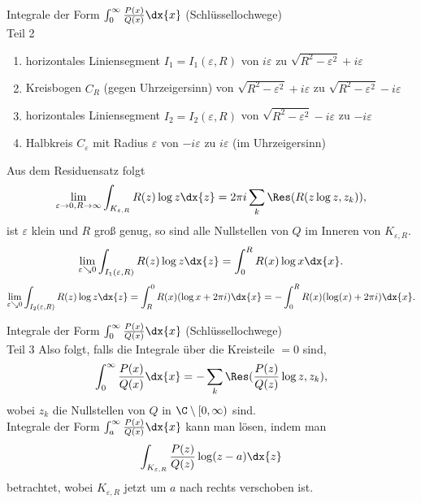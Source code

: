 \begin{karte}{Integrale der Form \( \int_0^\infty \frac{P(x)}{Q(x)} \dx{x} \) (Schlüssellochwege) \\Teil 2}
    \begin{enumerate}
        \item horizontales Liniensegment \(I_1 = I_1(\varepsilon, R)\) von \(i\varepsilon\) 
        zu \(\sqrt{R^2-\varepsilon^2} + i\varepsilon\)
        \item Kreisbogen \(C_R\) (gegen Uhrzeigersinn) von \(\sqrt{R^2-\varepsilon^2} + i\varepsilon\) 
        zu \(\sqrt{R^2-\varepsilon^2} - i\varepsilon\)
        \item horizontales Liniensegment \(I_2 = I_2(\varepsilon, R)\) von 
        \(\sqrt{R^2-\varepsilon^2} - i\varepsilon\) zu \(-i\varepsilon\)
        \item Halbkreis \(C_\varepsilon\) mit Radius \(\varepsilon\) von 
        \(-i\varepsilon\) zu \(i\varepsilon\) (im Uhrzeigersinn)
    \end{enumerate}
    Aus dem Residuensatz folgt 
    \[ \lim_{\varepsilon\rightarrow 0, R \rightarrow \infty} 
    \int_{K_{\varepsilon, R}} R(z) \log z \dx{z} 
    = 2\pi i \sum_k \Res(R(z \log z, z_k)), \]
    ist \(\varepsilon\) klein und \(R\) groß genug, so sind alle Nullstellen von 
    \(Q\) im Inneren von \(K_{\varepsilon, R}\).
    \[ \lim_{\varepsilon\searrow 0} \int_{I_1(\varepsilon,R)} R(z) \log z \dx{z} 
    = \int_0^R R(x) \log x \dx{x}. \]
    \[ \lim_{\varepsilon\searrow 0} \int_{I_2(\varepsilon, R)} R(z) \log z \dx{z} 
    = \int_R^0 R(x) (\log x + 2\pi i) \dx{x} = -\int_0^R R(x) (\log(x) + 2\pi i) \dx{x}. \]
\end{karte}

\begin{karte}{Integrale der Form \( \int_0^\infty \frac{P(x)}{Q(x)} \dx{x} \) (Schlüssellochwege) \\Teil 3}
    Also folgt, falls die Integrale über die Kreisteile \(=0\) sind, 
    \[ \int_0^\infty \frac{P(x)}{Q(x)} \dx{x} = -\sum_k \Res(\frac{P(z)}{Q(z)} \log z, z_k), \]
    wobei \(z_k\) die Nullstellen von \(Q\) in \(\C \setminus [0,\infty)\) sind.\\
    Integrale der Form \(\int_a^\infty \frac{P(x)}{Q(x)} \dx{x}\) kann man 
    lösen, indem man 
    \[ \int_{K_{\varepsilon, R}} \frac{P(z)}{Q(z)} \log(z-a) \dx{z} \]
    betrachtet, wobei \(K_{\varepsilon, R}\) jetzt um \(a\) nach rechts verschoben ist.
\end{karte}